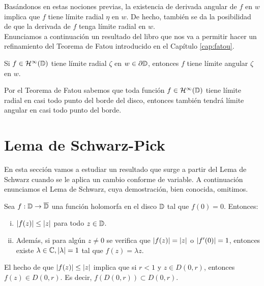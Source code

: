 Basándonos en estas nociones previas, la existencia de derivada angular de $f$ en $w$ implica que $f$ tiene límite radial $\eta$ en $w$. De hecho, también se da la posibilidad de que la derivada de $f$ tenga límite radial en $w$. \\

Enunciamos a continuación un resultado del libro \citet[capítulo 13]{conway2} que nos va a permitir hacer un refinamiento del Teorema de Fatou introducido en el Capítulo \ref{cap:fatou}. \\ %

\begin{corollary}
    Si $f \in \mathcal{H}^{\infty}(\mathbb{D})$ tiene límite radial $\zeta$ en $w \in \partial \mathbb{D}$, entonces $f$ tiene límite angular $\zeta$ en $w$.
\end{corollary}

Por el Teorema de Fatou sabemos que toda función $f \in \mathcal{H}^{\infty}(\mathbb{D})$ tiene límite radial en casi todo punto del borde del disco, entonces también tendrá límite angular en casi todo punto del borde. \\

\section{Lema de Schwarz-Pick}

En esta sección vamos a estudiar un resultado que surge a partir del Lema de Schwarz cuando se le aplica un cambio conforme de variable. A continuación enunciamos el Lema de Schwarz, cuya demostración, bien conocida, omitimos. \\

\begin{theorem}
    Sea $f: \mathbb{D} \to \overline{\mathbb{D}}$ una función holomorfa en el disco $\mathbb{D}$ tal que $f(0) = 0$. Entonces:
    \begin{enumerate}[(i)]
        \item $\left\lvert f(z)\right\rvert \leq \left\lvert z\right\rvert$ para todo $z \in \mathbb{D}$.
        \item Además, si para algún $z \not = 0$ se verifica que $\left\lvert f(z)\right\rvert = \left\lvert z\right\rvert$ o $\left\lvert f'(0)\right\rvert = 1$, entonces existe $\lambda \in \mathbb{C}, \left\lvert\lambda\right\rvert = 1$ tal que $f(z)=\lambda z$.
    \end{enumerate}
\end{theorem}

\begin{obs}
    El hecho de que $\left\lvert f(z)\right\rvert \leq \left\lvert z\right\rvert$ implica que si $r < 1$ y $z \in D(0,r)$, entonces $f(z) \in D(0,r)$. Es decir, $f(D(0,r)) \subset D(0,r)$. \\
\end{obs}

